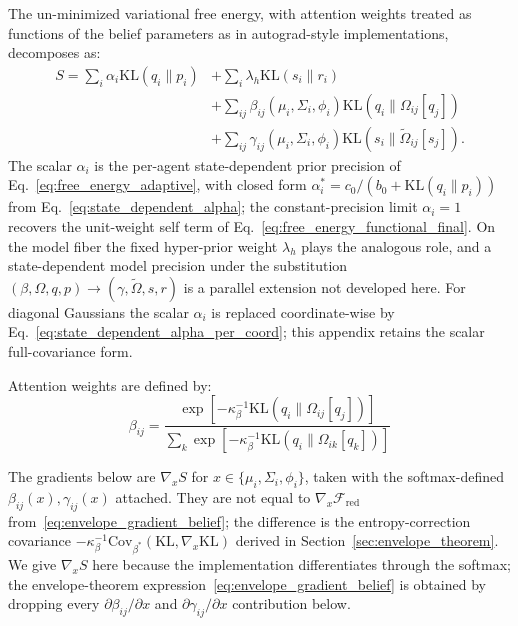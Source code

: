 \documentclass[11pt]{article}
\begin{document}
The un-minimized variational free energy, with attention weights treated as functions of the belief parameters as in autograd-style implementations, decomposes as:
\begin{equation}
\begin{aligned}
S = \sum_i \alpha_i \mathrm{KL}(q_i \| p_i) &+ \sum_i \lambda_h \mathrm{KL}(s_i \| r_i) \\
 &+ \sum_{ij} \beta_{ij}(\mu_i, \Sigma_i, \phi_i) \mathrm{KL}(q_i \| \Omega_{ij}[q_j]) \\
 &+ \sum_{ij} \gamma_{ij}(\mu_i, \Sigma_i, \phi_i) \mathrm{KL}(s_i \| \tilde{\Omega}_{ij}[s_j]).
\end{aligned}
\end{equation}
The scalar $\alpha_i$ is the per-agent state-dependent prior precision of Eq.~\eqref{eq:free_energy_adaptive}, with closed form $\alpha_i^* = c_0/(b_0 + \mathrm{KL}(q_i \| p_i))$ from Eq.~\eqref{eq:state_dependent_alpha}; the constant-precision limit $\alpha_i = 1$ recovers the unit-weight self term of Eq.~\eqref{eq:free_energy_functional_final}. On the model fiber the fixed hyper-prior weight $\lambda_h$ plays the analogous role, and a state-dependent model precision under the substitution $(\beta, \Omega, q, p) \to (\gamma, \tilde\Omega, s, r)$ is a parallel extension not developed here. For diagonal Gaussians the scalar $\alpha_i$ is replaced coordinate-wise by Eq.~\eqref{eq:state_dependent_alpha_per_coord}; this appendix retains the scalar full-covariance form.

Attention weights are defined by:
\begin{equation}
\beta_{ij} = \frac{\exp\left[-\kappa_\beta^{-1}\mathrm{KL}(q_i \| \Omega_{ij}[q_j])\right]}{\sum_k \exp\left[-\kappa_\beta^{-1}\mathrm{KL}(q_i \| \Omega_{ik}[q_k])\right]}
\end{equation}

The gradients below are $\nabla_x S$ for $x \in \{\mu_i, \Sigma_i, \phi_i\}$, taken with the softmax-defined $\beta_{ij}(x), \gamma_{ij}(x)$ attached. They are not equal to $\nabla_x \mathcal{F}_{\mathrm{red}}$ from~\eqref{eq:envelope_gradient_belief}; the difference is the entropy-correction covariance $-\kappa_\beta^{-1}\mathrm{Cov}_{\beta^*}(\mathrm{KL}, \nabla_x \mathrm{KL})$ derived in Section~\ref{sec:envelope_theorem}. We give $\nabla_x S$ here because the implementation differentiates through the softmax; the envelope-theorem expression~\eqref{eq:envelope_gradient_belief} is obtained by dropping every $\partial \beta_{ij}/\partial x$ and $\partial \gamma_{ij}/\partial x$ contribution below.
\end{document}
